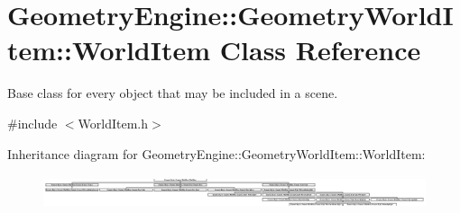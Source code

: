 \hypertarget{class_geometry_engine_1_1_geometry_world_item_1_1_world_item}{}\section{Geometry\+Engine\+::Geometry\+World\+Item\+::World\+Item Class Reference}
\label{class_geometry_engine_1_1_geometry_world_item_1_1_world_item}


Base class for every object that may be included in a scene.  




{\ttfamily \#include $<$World\+Item.\+h$>$}

Inheritance diagram for Geometry\+Engine\+::Geometry\+World\+Item\+::World\+Item\+:\begin{figure}[H]
\begin{center}
\leavevmode
\includegraphics[height=1.002088cm]{class_geometry_engine_1_1_geometry_world_item_1_1_world_item}
\end{center}
\end{figure}

